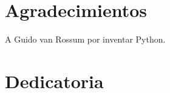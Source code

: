 \chapter*{Agradecimientos}
A Guido van Rossum por inventar Python.

\newpage
{}
\chapter*{Dedicatoria}


